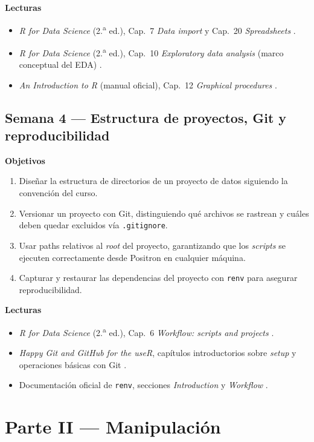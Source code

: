 \documentclass[11pt,letterpaper]{article}
\newcommand{\semanaSucinta}[2]{%
  \subsection*{\color{main}Semana #1 --- #2}%
}
\begin{document}
\noindent\textbf{Lecturas}
\begin{itemize}[leftmargin=*, itemsep=1pt]
    \item \textit{R for Data Science} (2.\textsuperscript{a} ed.), Cap.\ 7 \textit{Data import} y Cap.\ 20 \textit{Spreadsheets} \cite{wickham2023r4ds}.
    \item \textit{R for Data Science} (2.\textsuperscript{a} ed.), Cap.\ 10 \textit{Exploratory data analysis} (marco conceptual del EDA) \cite{wickham2023r4ds}.
    \item \textit{An Introduction to R} (manual oficial), Cap.\ 12 \textit{Graphical procedures} \cite{rcoreteam-intro}.
\end{itemize}

\semanaSucinta{4}{Estructura de proyectos, Git y reproducibilidad}

\noindent\textbf{Objetivos}
\begin{enumerate}[leftmargin=*, itemsep=1pt]
    \item Diseñar la estructura de directorios de un proyecto de datos siguiendo la convención del curso.
    \item Versionar un proyecto con Git, distinguiendo qué archivos se rastrean y cuáles deben quedar excluidos vía \texttt{.gitignore}.
    \item Usar paths relativos al \textit{root} del proyecto, garantizando que los \textit{scripts} se ejecuten correctamente desde Positron en cualquier máquina.
    \item Capturar y restaurar las dependencias del proyecto con \texttt{renv} para asegurar reproducibilidad.
\end{enumerate}

\noindent\textbf{Lecturas}
\begin{itemize}[leftmargin=*, itemsep=1pt]
    \item \textit{R for Data Science} (2.\textsuperscript{a} ed.), Cap.\ 6 \textit{Workflow: scripts and projects} \cite{wickham2023r4ds}.
    \item \textit{Happy Git and GitHub for the useR}, capítulos introductorios sobre \textit{setup} y operaciones básicas con Git \cite{bryan-happygit}.
    \item Documentación oficial de \texttt{renv}, secciones \textit{Introduction} y \textit{Workflow} \cite{ushey-renv}.
\end{itemize}

\section*{\color{main}Parte II --- Manipulación}
\end{document}

